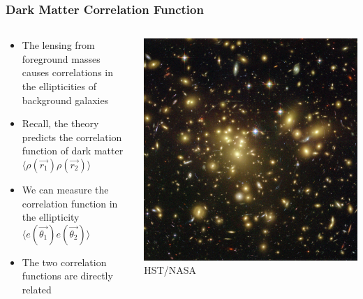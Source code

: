 \documentclass{beamer}
\begin{document}
\frame
{

    \frametitle{Dark Matter Correlation Function}


    \begin{columns}
        \begin{column}{0.5\textwidth}
            \begin{itemize}

                \item The lensing from foreground masses
                    causes correlations in the ellipticities of background
                    galaxies

                \item Recall, the theory predicts the correlation function of
                    dark matter {\color{gold} $\langle \rho(\vec{r_1}) \rho(\vec{r_2})
                    \rangle$ }

                \item We can measure the correlation function in the
                    ellipticity {\color{gold} $\langle e(\vec{\theta_1})
                    e(\vec{\theta_2}) \rangle$ }

                \item The two correlation functions are directly related

            \end{itemize}

        \end{column}
        \begin{column}{0.5\textwidth}
            \begin{center}
                \includegraphics[width=\textwidth]{abell-1689-hubble.jpg}
                \newline
                {\tiny HST/NASA}
            \end{center}
        \end{column}


\end{columns}}
\end{document}

